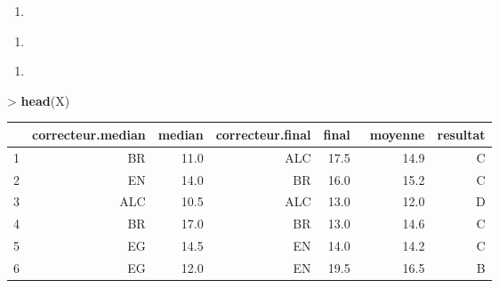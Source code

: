 \documentclass[
]{article}
\newenvironment{Shaded}{}{}
\newcommand{\CommentTok}[1]{\textcolor[rgb]{0.38,0.63,0.69}{\textit{#1}}}
\newcommand{\KeywordTok}[1]{\textcolor[rgb]{0.00,0.44,0.13}{\textbf{#1}}}
\newcommand{\NormalTok}[1]{#1}
\newcommand{\OperatorTok}[1]{\textcolor[rgb]{0.40,0.40,0.40}{#1}}
\newcommand{\StringTok}[1]{\textcolor[rgb]{0.25,0.44,0.63}{#1}}
\providecommand{\tightlist}{%
  \setlength{\itemsep}{0pt}\setlength{\parskip}{0pt}}
\begin{document}
\begin{enumerate}
\def\labelenumi{\arabic{enumi}.}
\setcounter{enumi}{15}
\tightlist
\item
\end{enumerate}

\begin{Shaded}
\end{Shaded}

\begin{enumerate}
\def\labelenumi{\arabic{enumi}.}
\setcounter{enumi}{16}
\tightlist
\item
\end{enumerate}

\begin{Shaded}
\end{Shaded}

\begin{enumerate}
\def\labelenumi{\arabic{enumi}.}
\setcounter{enumi}{17}
\tightlist
\item
\end{enumerate}

\begin{Shaded}
\begin{Highlighting}[]
\OperatorTok{\textgreater{}}\StringTok{ }\KeywordTok{head}\NormalTok{(X)}
\end{Highlighting}
\end{Shaded}

\begin{longtable}[]{@{}rrrrrrr@{}}
\toprule
& correcteur.median & median & correcteur.final & final & ~moyenne &
resultat\tabularnewline
\midrule
\endhead
1 & BR & 11.0 & ALC & 17.5 & ~ 14.9 & C\tabularnewline
2 & EN & 14.0 & BR & 16.0 & ~ 15.2 & C\tabularnewline
3 & ALC & 10.5 & ALC & 13.0 & ~ 12.0 & D\tabularnewline
4 & BR & 17.0 & BR & 13.0 & ~ 14.6 & C\tabularnewline
5 & EG & 14.5 & EN & 14.0 & ~ 14.2 & C\tabularnewline
6 & EG & 12.0 & EN & 19.5 & ~ 16.5 & B\tabularnewline
\bottomrule
\end{longtable}
\end{document}
